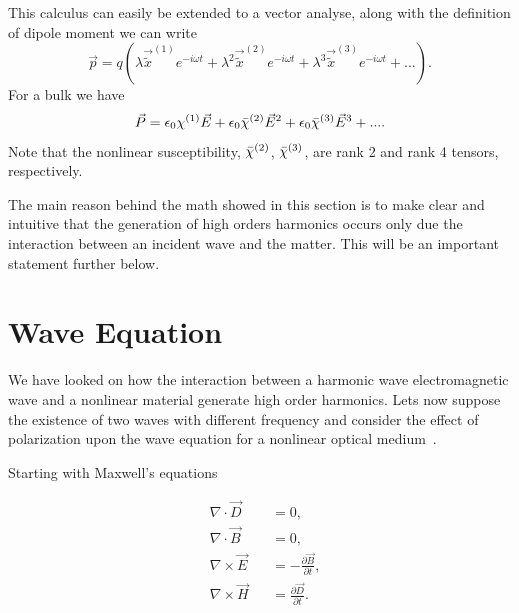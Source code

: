 This calculus can easily be extended to a vector analyse, along with the definition of dipole moment we can write
\begin{equation}
    \vec{p} = q\left(\lambda\vec{\tilde{x}}^{(1)}e^{-i\omega t}+\lambda^2\vec{\tilde{x}}^{(2)}e^{-i\omega t}+\lambda^3\vec{\tilde{x}}^{(3)}e^{-i\omega t}+... \right).
\end{equation}
For a bulk we have
\begin{equation}
    \vec{P} = \epsilon_0\chi^{(1)}\vec{E} + \epsilon_0\Bar{\chi}^{(2)}\vec{E}^2+\epsilon_0\Bar{\chi}^{(3)}\vec{E}^3+....
\label{eq:nonlim_pol}
\end{equation}
Note that the nonlinear susceptibility, $\Bar{\chi}^{(2)}$, $\Bar{\chi}^{(3)}$, are rank 2 and rank 4 tensors, respectively.

The main reason behind the math showed in this section is to make clear and intuitive that the generation of high orders harmonics occurs only due the interaction between an incident wave and the matter. This will be an important statement further below. 

\section{Wave Equation}
\label{sec:wave_equation}

We have looked on how the interaction between a harmonic wave electromagnetic wave and a nonlinear material generate high order harmonics. Lets now suppose the existence of two waves with different frequency and consider the effect of polarization upon the wave equation for a nonlinear optical medium~\cite{Boyd2003}. 

Starting with Maxwell's equations

\begin{subequations}
    \begin{alignat}{2}
        &\nabla\cdot\vec{D}  &&= 0,\\
        &\nabla\cdot\vec{B}  &&= 0,\\
        &\nabla\times\vec{E} &&= -\frac{\partial\vec{B}}{\partial t},\\ 
        &\nabla\times\vec{H} &&= \frac{\partial\vec{D}}{\partial t}.
    \end{alignat}
    \label{eq:max_eq}
\end{subequations}

